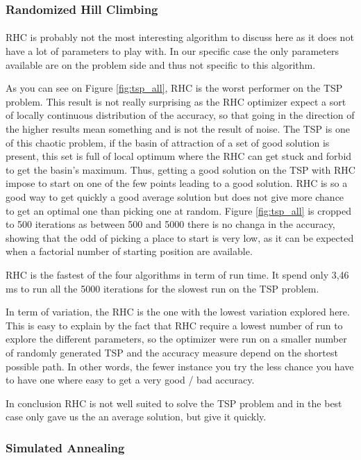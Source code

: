 \documentclass[twocolumn,a4paper,10pt]{article}
\begin{document}
\subsubsection{Randomized Hill Climbing} \label{tsp_rhc}
\paragraph{}
RHC is probably not the most interesting algorithm to discuss here as it does not have a lot of parameters to play with. In our specific case the only parameters available are on the problem side and thus not specific to this algorithm.

As you can see on Figure \ref{fig:tsp_all}, RHC is the worst performer on the TSP problem. This result is not really surprising as the RHC optimizer expect a sort of locally continuous distribution of the accuracy, so that going in the direction of the higher results mean something and is not the result of noise. The TSP is one of this chaotic problem, if the basin of attraction of a set of good solution is present, this set is full of local optimum where the RHC can get stuck and forbid to get the basin's maximum. Thus, getting a good solution on the TSP with RHC impose to start on one of the few points leading to a good solution. RHC is so a good way to get quickly a good average solution but does not give more chance to get an optimal one than picking one at random. Figure \ref{fig:tsp_all} is cropped to 500 iterations as between 500 and 5000 there is no changa in the accuracy, showing that the odd of picking a place to start is very low, as it can be expected when a factorial number of starting position are available.

RHC is the fastest of the four algorithms in term of run time. It spend only 3,46 ms to run all the 5000 iterations for the slowest run on the TSP problem.

In term of variation, the RHC is the one with the lowest variation explored here. This is easy to explain by the fact that RHC require a lowest number of run to explore the different parameters, so the optimizer were run on a smaller number of randomly generated TSP and the accuracy measure depend on the shortest possible path. In other words, the fewer instance you try the less chance you have to have one where easy to get a very good / bad accuracy.

In conclusion RHC is not well suited to solve the TSP problem and in the best case only gave us the an average solution, but give it quickly.
\subsubsection{Simulated Annealing} \label{tsp_sa}
\end{document}
